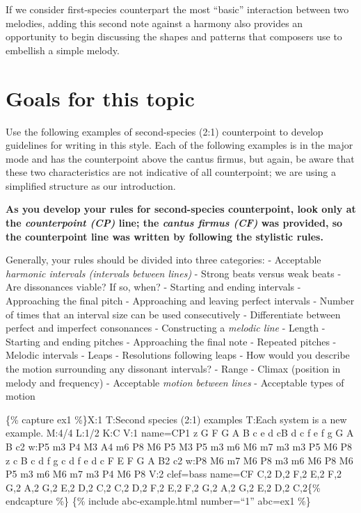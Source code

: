 \documentclass{book}
\begin{document}
If we consider first-species counterpart the most ``basic'' interaction
between two melodies, adding this second note against a harmony also provides
an opportunity to begin discussing the shapes and patterns that composers use
to embellish a simple melody.

\hypertarget{goals-for-this-topic-11}{%
\section{Goals for this topic}\label{goals-for-this-topic-11}}

Use the following examples of second-species (2:1) counterpoint to develop
guidelines for writing in this style. Each of the following examples is in the
major mode and has the counterpoint above the cantus firmus, but again, be
aware that these two characteristics are not indicative of all counterpoint;
we are using a simplified structure as our introduction.

\textbf{As you develop your rules for second-species counterpoint, look only
at the \emph{counterpoint (CP)} line; the \emph{cantus firmus (CF)} was
provided, so the counterpoint line was written by following the stylistic
rules.}

Generally, your rules should be divided into three categories: - Acceptable
\emph{harmonic intervals (intervals between lines)} - Strong beats versus weak
beats - Are dissonances viable? If so, when? - Starting and ending intervals -
Approaching the final pitch - Approaching and leaving perfect intervals -
Number of times that an interval size can be used consecutively -
Differentiate between perfect and imperfect consonances - Constructing a
\emph{melodic line} - Length - Starting and ending pitches - Approaching the
final note - Repeated pitches - Melodic intervals - Leaps - Resolutions
following leaps - How would you describe the motion surrounding any dissonant
intervals? - Range - Climax (position in melody and frequency) - Acceptable
\emph{motion between lines} - Acceptable types of motion

\{\% capture ex1 \%\}X:1 T:Second species (2:1) examples T:Each system is a
new example. M:4/4 L:1/2 K:C V:1 name=CP1 z G\textbar{} F G\textbar{} A
B\textbar{} c e\textbar{} d c\textbar B d\textbar{} c f\textbar{} e
f\textbar{} g G\textbar{} A B\textbar{} c2\textbar{]} w:P5 m3 P4 M3 A4 m6 P8
M6 P5 M3 P5 m3 m6 M6 m7 m3 m3 P5 M6 P8 z c\textbar{} B c\textbar{} d
f\textbar{} g c\textbar{} d f\textbar{} e d\textbar{} c F\textbar{} E
F\textbar{} G A\textbar{} B2\textbar{} c2\textbar{]} w:P8 M6 m7 M6 P8 m3 m6 M6
P8 M6 P5 m3 m6 M6 m7 m3 P4 M6 P8 V:2 clef=bass name=CF C,2\textbar{}
D,2\textbar{} F,2\textbar{} E,2\textbar{} F,2\textbar{} G,2\textbar{}
A,2\textbar{} G,2\textbar{} E,2\textbar{} D,2\textbar{} C,2\textbar{]}
C,2\textbar{} D,2\textbar{} F,2\textbar{} E,2\textbar{} F,2\textbar{}
G,2\textbar{} A,2\textbar{} G,2\textbar{} E,2\textbar{} D,2\textbar{}
C,2\textbar{]}\{\% endcapture \%\} \{\% include abc-example.html number=``1''
abc=ex1 \%\}
\end{document}
